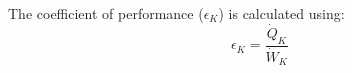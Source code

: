 The coefficient of performance (\(\epsilon_K\)) is calculated using:  
\[
\epsilon_K = \frac{\dot{Q}_K}{\dot{W}_K}
\]